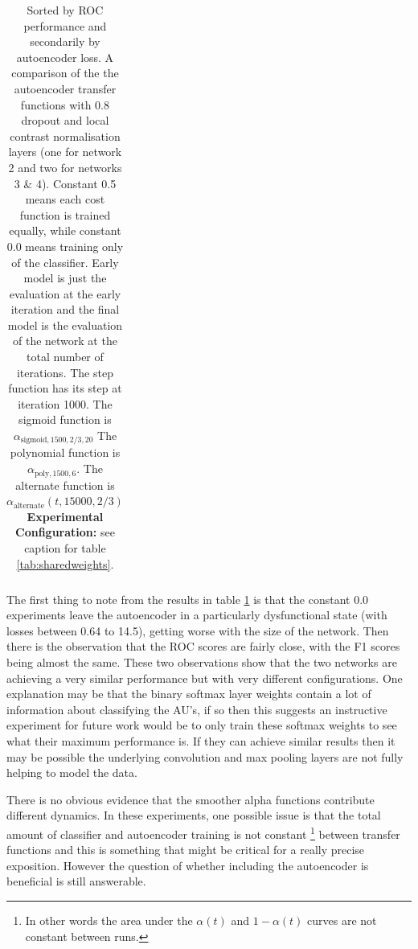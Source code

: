 \begin{table}[]
{\begin{tabular}{rrrrrrrrrrr}
          \hline
          \end{tabular}
          }
          \caption{Sorted by ROC performance and secondarily by autoencoder loss.
          A comparison of the the autoencoder transfer functions with 0.8 dropout and local contrast normalisation layers (one for network 2 and two for networks 3 \& 4).
          Constant 0.5 means each cost function is trained equally, while constant 0.0 means training only of the classifier.
          Early model is just the evaluation at the early iteration and the final model is the evaluation of the network at the total number of iterations.
          The step function has its step at iteration 1000.
          The sigmoid function is $\alpha_{\text{sigmoid},1500,2/3,20}$
          The polynomial function is $\alpha_{\text{poly},1500,6}$.
          The alternate function is $\alpha_{\text{alternate}}(t,15000,2/3)$
          {\bf Experimental Configuration:} see caption for table \ref{tab:sharedweights}.} \label{tab:auto_final_1}
        \end{table}

          The first thing to note from the results in table \ref{tab:auto_final_1} is that
          the constant 0.0 experiments leave the autoencoder in a particularly dysfunctional state (with losses between 0.64 to 14.5),
          getting worse with the size of the network. Then there is the observation that
          the ROC scores are fairly close, with the F1 scores being almost the same. These two
          observations show that the two networks are achieving a very similar performance but
          with very different configurations. One explanation may be that the binary softmax layer weights
          contain a lot of information about classifying the AU's, if so then this suggests an
          instructive experiment for future work would be to only train these softmax weights to see
          what their maximum performance is. If they can achieve similar results then it may be possible
          the underlying convolution and max pooling layers are not fully helping to model the data.

          There is no obvious evidence that the smoother alpha functions contribute different
          dynamics. In these experiments, one possible issue is that
          the total amount of classifier and autoencoder training is not constant
          \footnote{In other words the area under the $\alpha(t)$ and $1-\alpha(t)$ curves are not constant between runs.}
          between transfer functions
          and this is something that might be critical for a really precise exposition. However the question of whether
          including the autoencoder is beneficial is still answerable.

